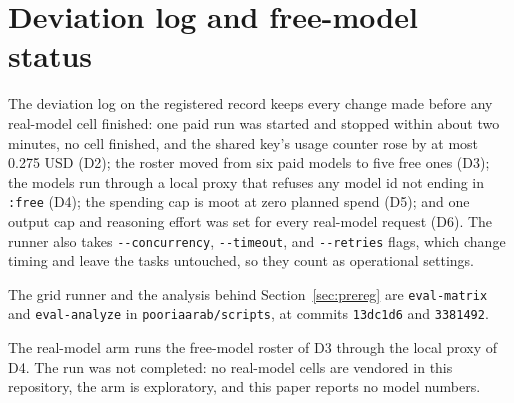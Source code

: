 \section{Deviation log and free-model status}
\label{app:deviations}

The deviation log on the registered record keeps every change made before any real-model cell finished: one paid run was started and stopped within about two minutes, no cell finished, and the shared key's usage counter rose by at most 0.275 USD (D2); the roster moved from six paid models to five free ones (D3); the models run through a local proxy that refuses any model id not ending in \texttt{:free} (D4); the spending cap is moot at zero planned spend (D5); and one output cap and reasoning effort was set for every real-model request (D6). The runner also takes \texttt{-{}-concurrency}, \texttt{-{}-timeout}, and \texttt{-{}-retries} flags, which change timing and leave the tasks untouched, so they count as operational settings.

The grid runner and the analysis behind Section~\ref{sec:prereg} are \texttt{eval-matrix} and \texttt{eval-analyze} in \texttt{pooriaarab/scripts}, at commits \texttt{13dc1d6} and \texttt{3381492}.

The real-model arm runs the free-model roster of D3 through the local proxy of D4. The run was not completed: no real-model cells are vendored in this repository, the arm is exploratory, and this paper reports no model numbers.
